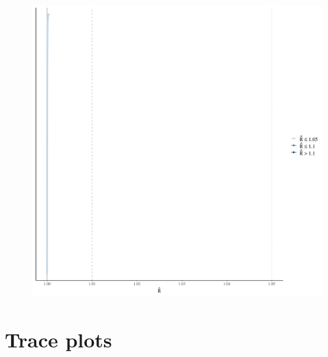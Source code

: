 \documentclass[
]{report}
\begin{document}
\begin{figure}

{\centering \includegraphics[width=1\textwidth,height=\textheight]{diagnostic_plots_files/figure-pdf/unnamed-chunk-25-1.pdf}

}

\end{figure}

\hypertarget{trace-plots-8}{%
\section{Trace plots}\label{trace-plots-8}}
\end{document}
